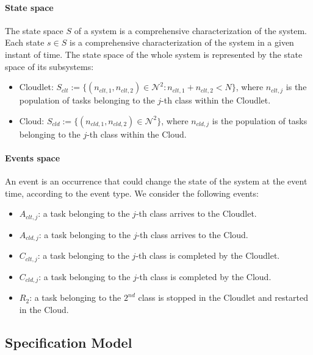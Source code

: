 \paragraph{State space}
The state space $S$ of a system is a comprehensive characterization of the system. Each state $s \in S$ is a comprehensive characterization of the system in a given instant of time.
The state space of the whole system is represented by the state space of its subsystems:

\begin{itemize}
	\item Cloudlet: $S_{clt} := \{(n_{clt,1},n_{clt,2})\in \mathcal{N}^{2}: n_{clt,1}+n_{clt,2}<N\}$, where $n_{clt,j}$ is the population of tasks belonging to the $j$-th class within the Cloudlet.
	
	\item Cloud: $S_{cld} := \{(n_{cld,1},n_{cld,2})\in \mathcal{N}^{2}\}$, where $n_{cld,j}$ is the population of tasks belonging to the $j$-th class within the Cloud.
\end{itemize}

\paragraph{Events space}
An event is an occurrence that could change the state of the system at the event time, according to the event type.
We consider the following events:

\begin{itemize}
	\item $A_{clt,j}$: a task belonging to the $j$-th class arrives to the Cloudlet.
	
	\item $A_{cld,j}$: a task belonging to the $j$-th class arrives to the Cloud.

	\item $C_{clt,j}$: a task belonging to the $j$-th class is completed by the Cloudlet.
	
	\item $C_{cld,j}$: a task belonging to the $j$-th class is completed by the Cloud.
	
	\item $R_{2}$: a task belonging to the $2^{nd}$ class is stopped in the Cloudlet and restarted in the Cloud.
\end{itemize}

\subsection{Specification Model}

